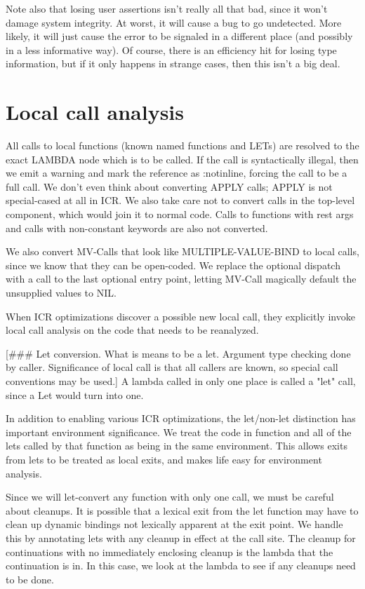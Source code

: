 Note also that losing user assertions isn't really all that bad, since it won't
damage system integrity.  At worst, it will cause a bug to go undetected.  More
likely, it will just cause the error to be signaled in a different place (and
possibly in a less informative way).  Of course, there is an efficiency hit for
losing type information, but if it only happens in strange cases, then this
isn't a big deal.


\chapter{Local call analysis}

All calls to local functions (known named functions and LETs) are resolved to
the exact LAMBDA node which is to be called.  If the call is syntactically
illegal, then we emit a warning and mark the reference as :notinline, forcing
the call to be a full call.  We don't even think about converting APPLY calls;
APPLY is not special-cased at all in ICR.  We also take care not to convert
calls in the top-level component, which would join it to normal code.  Calls to
functions with rest args and calls with non-constant keywords are also not
converted.

We also convert MV-Calls that look like MULTIPLE-VALUE-BIND to local calls,
since we know that they can be open-coded.  We replace the optional dispatch
with a call to the last optional entry point, letting MV-Call magically default
the unsupplied values to NIL.

When ICR optimizations discover a possible new local call, they explicitly
invoke local call analysis on the code that needs to be reanalyzed. 

[\#\#\# Let conversion.  What is means to be a let.  Argument type checking done
by caller.  Significance of local call is that all callers are known, so
special call conventions may be used.]
A lambda called in only one place is called a "let" call, since a Let would
turn into one.

In addition to enabling various ICR optimizations, the let/non-let distinction
has important environment significance.  We treat the code in function and all
of the lets called by that function as being in the same environment.  This
allows exits from lets to be treated as local exits, and makes life easy for
environment analysis.  

Since we will let-convert any function with only one call, we must be careful
about cleanups.  It is possible that a lexical exit from the let function may
have to clean up dynamic bindings not lexically apparent at the exit point.  We
handle this by annotating lets with any cleanup in effect at the call site.
The cleanup for continuations with no immediately enclosing cleanup is the
lambda that the continuation is in.  In this case, we look at the lambda to see
if any cleanups need to be done.

